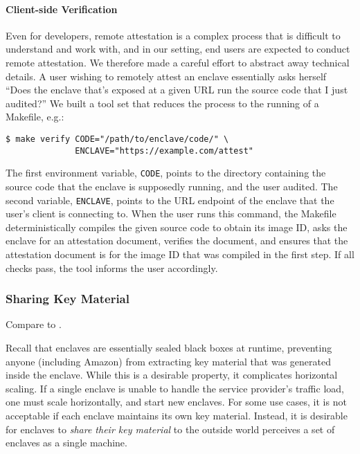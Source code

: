 \paragraph{Client-side Verification}

Even for developers, remote attestation is a complex process that is difficult
to understand and work with, and in our setting, end users are expected to
conduct remote attestation.  We therefore made a careful effort to abstract
away technical details.  A user wishing to remotely attest an enclave
essentially asks herself ``Does the enclave that's exposed at a given URL run
the source code that I just audited?''  We built a tool set that reduces the
process to the running of a Makefile, e.g.:

\begin{lstlisting}
$ make verify CODE="/path/to/enclave/code/" \
              ENCLAVE="https://example.com/attest"
\end{lstlisting}

The first environment variable, \texttt{CODE}, points to the directory
containing the source code that the enclave is supposedly running, and the user
audited.  The second variable, \texttt{ENCLAVE}, points to the URL endpoint of
the enclave that the user's client is connecting to.  When the user runs this
command, the Makefile deterministically compiles the given source code to
obtain its image ID, asks the enclave for an attestation document, verifies the
document, and ensures that the attestation document is for the image ID that
was compiled in the first step.  If all checks pass, the tool informs the user
accordingly.

\subsubsection{Sharing Key Material}
\label{sec:sync}

Compare to \cite{Chen2022a}.

Recall that enclaves are essentially sealed black boxes at runtime, preventing
anyone (including Amazon) from extracting key material that was generated
inside the enclave.  While this is a desirable property, it complicates
horizontal scaling.  If a single enclave is unable to handle the service
provider's traffic load, one must scale horizontally, and start new enclaves.
For some use cases, it is not acceptable if each enclave maintains its own key
material.  Instead, it is desirable for enclaves to \emph{share their key
material} to the outside world perceives a set of enclaves as a single machine.


